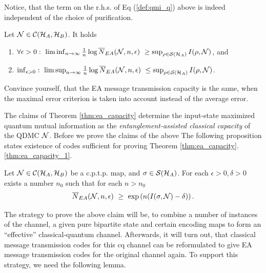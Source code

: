 \begin{remark}
Notice, that the term on the r.h.s. of Eq (\ref{def:qmi_q}) above is indeed independent of the choice of 
purification.
\end{remark}
\begin{theorem}\label{thm:ea_capacity}
Let ${\mathcal N} \in {\mathcal C}({\mathcal H}_A, {\mathcal H}_B)$. It holds
\begin{enumerate}
 \item $\forall \epsilon > 0: \ \liminf_{n \rightarrow \infty} \frac{1}{n} \log \overline{N}_{EA}({\mathcal N},n, \epsilon) \ \geq \sup_{\rho \in {\mathcal S}({\mathcal H}_A)} I(\rho, {\mathcal N})$, and \label{thm:ea_capacity_1}
 \item $\inf_{\epsilon > 0}: \ \limsup_{n \rightarrow \infty} \frac{1}{n} \log \overline{N}_{EA}({\mathcal N},n, \epsilon) \ \leq \sup_{\rho \in {\mathcal S}({\mathcal H}_A)} I(\rho, {\mathcal N})$.  \label{thm:ea_capacity_2}
\end{enumerate}
\end{theorem}
\begin{exercise}
 Convince yourself, that the EA message transmission capacity is the same, when the maximal error criterion is taken into account instead of the average error. 
\end{exercise}
The claims of Theorem \ref{thm:ea_capacity} determine the input-state maximized quantum mutual information as the \emph{entanglement-assisted classical capacity} of the QDMC ${\mathcal N}$.
Before we prove the claims of the above 
The following proposition states existence of codes sufficient for proving Theorem \ref{thm:ea_capacity}.\ref{thm:ea_capacity_1}. 
\begin{proposition}\label{prop:ea_achiev_codes}
 Let ${\mathcal N} \in {\mathcal C}({\mathcal H}_A, {\mathcal H}_B)$ be a c.p.t.p. map, and $\sigma \in {\mathcal S}({\mathcal H}_A)$. For each $\epsilon > 0, \delta > 0$ exists a number $n_0$ such that for each $n > n_0$
 \begin{align*}
  \overline{N}_{EA}({\mathcal N}, n ,\epsilon) \ \geq \ \exp\left(n(I(\sigma, {\mathcal N}) - \delta) \right).
 \end{align*}
\end{proposition}
The strategy to prove the above claim will be, to combine a number of instances of the channel, a given pure bipartite state and certain encoding maps to form an ``effective'' classical-quantum channel. 
Afterwards, it will turn out, that classical message transmission codes for this cq channel can be reformulated to give EA message transmission codes for the original channel again. To support this strategy, we need the following lemma. 
